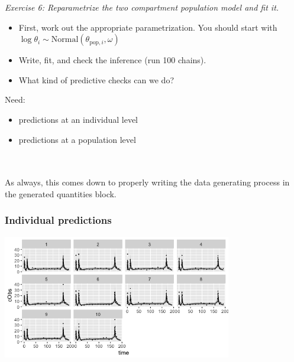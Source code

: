 \documentclass[xcolor=table]{beamer}
\begin{document}
\begin{frame}

  \textit{\textcolor{MRGGreen}{Exercise 6}:
    Reparametrize the two compartment population model and fit it.}
    \begin{itemize}
      \item First, work out the appropriate parametrization. You should start with
      $\log \theta_i \sim \mathrm{Normal}(\theta_{\mathrm{pop}, i}, \omega)$
      \item Write, fit, and check the inference (run 100 chains).
      \item What kind of predictive checks can we do?
    \end{itemize}

\end{frame}

\begin{frame}
  Need:
  \begin{itemize}
    \item predictions at an individual level
    \item predictions at a population level
  \end{itemize}

  \ \\ \ \\
  As always, this comes down to properly writing the data generating process
  in the generated quantities block.

\end{frame}

\begin{frame}
  \frametitle{Individual predictions}
  
  \begin{center}
    \includegraphics[width = 10cm]{../figures/PredictionPatient.png}
  \end{center}
  
\end{frame}
\end{document}
